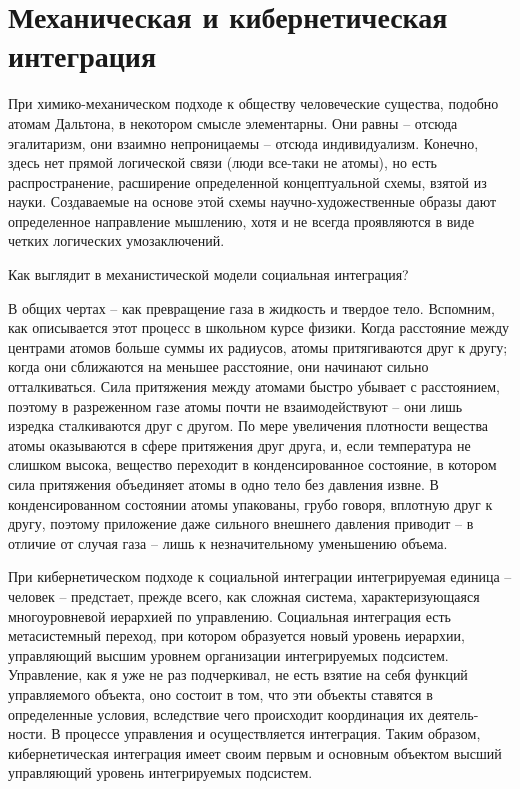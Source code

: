 \documentclass{book}
\begin{document}
\section{Механическая и кибернетическая интеграция}

При химико-механическом подходе к обществу человече­ские существа, подобно атомам Дальтона, в некотором смысле элементарны.  Они равны -- отсюда эгалитаризм, они взаимно непроницаемы -- отсюда индивидуализм. Конечно, здесь нет прямой логической связи (люди все-таки не атомы), но есть распространение, расширение определенной концептуальной схе­мы, взятой из науки. Создаваемые на основе этой схемы науч­но-художественные образы дают определенное направление мышлению, хотя и не всегда проявляются в виде четких ло­гических умозаключений.

Как выглядит в механистической модели социальная интег­рация?

В общих чертах -- как превращение газа в жидкость и твер­дое тело. Вспомним, как описывается этот процесс в школь­ном курсе физики. Когда расстояние между центрами атомов больше суммы их радиусов, атомы притягиваются друг к другу; когда они сближаются на меньшее расстояние, они начи­нают сильно отталкиваться. Сила притяжения между атомами быстро убывает с расстоянием, поэтому в разреженном газе атомы почти не взаимодействуют -- они лишь изредка сталки­ваются друг с другом. По мере увеличения плотности вещест­ва атомы оказываются в сфере притяжения друг друга, и, если температура не слишком высока, вещество переходит в кон­денсированное состояние, в котором сила притяжения объе­диняет атомы в одно тело без давления извне. В конденсиро­ванном состоянии атомы упакованы, грубо говоря, вплотную друг к другу, поэтому приложение даже сильного внешнего давления приводит -- в отличие от случая газа -- лишь к незна­чительному уменьшению объема.

При кибернетическом подходе к социальной интеграции ин­тегрируемая единица -- человек -- предстает, прежде всего, как сложная система,  характеризующаяся многоуровневой иерархией по управлению. Социальная интеграция есть метасистемный переход, при котором образуется новый уровень иерархии, управляющий высшим уровнем организации интег­рируемых подсистем. Управление, как я уже не раз подчерки­вал, не есть взятие на себя функций управляемого объекта, оно состоит в том, что эти объекты ставятся в определенные условия, вследствие чего происходит координация их деятель­ности. В процессе управления и осуществляется интеграция. Таким образом, кибернетическая интеграция имеет своим пер­вым и основным объектом высший управляющий уровень ин­тегрируемых подсистем.
\end{document}
